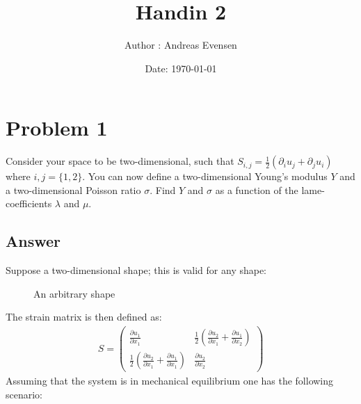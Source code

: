 \documentclass{article}
\title{Handin 2}
\author{Author : Andreas Evensen}
\date{Date: \today}
\begin{document}
\maketitle

\section*{Problem 1}
Consider your space to be two-dimensional, such that $S_{i,j} = \frac{1}{2}(\partial_i u_j + \partial_j u_i)$ where $i,j = \{1,2\}$.
You can now define a two-dimensional Young's modulus $Y$ and a two-dimensional Poisson ratio $\sigma$. Find $Y$ and $\sigma$ as a function of the lame-coefficients $\lambda$ and $\mu$.
\subsection*{Answer}
Suppose a two-dimensional shape; this is valid for any shape:
\begin{figure}[H]
    \centering
    \caption{An arbitrary shape}
\end{figure}\noindent
The strain matrix is then defined as:
\begin{align*}
    S = \begin{pmatrix}
        \frac{\partial u_1}{\partial x_1} & \frac{1}{2}\left(\frac{\partial u_2}{\partial x_1} + \frac{\partial u_1}{\partial x_2}\right)\\
        \frac{1}{2}\left(\frac{\partial u_2}{\partial x_1} + \frac{\partial u_1}{\partial x_1}\right) & \frac{\partial u_2}{\partial x_2}
    \end{pmatrix}   
\end{align*}Assuming that the system is in mechanical equilibrium one has the following scenario:
\end{document}
